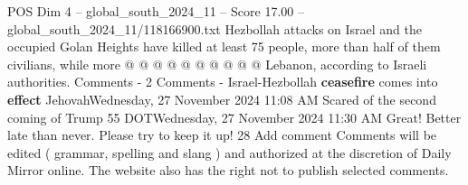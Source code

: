 \begin{textsample}{POS Dim 4 – global\_south\_2024\_11 – Score 17.00 – global\_south\_2024\_11/118166900.txt}
Hezbollah attacks on Israel and the occupied Golan Heights have killed at least 75 people, more than half of them civilians, while more @ @ @ @ @ @ @ @ @ @ Lebanon, according to Israeli authorities.
Comments - 2 Comments - Israel-Hezbollah \textbf{ceasefire} comes into \textbf{effect} JehovahWednesday, 27 November 2024 11:08 AM Scared of the second coming of Trump 55 DOTWednesday, 27 November 2024 11:30 AM Great!
Better late than never.
Please try to keep it up! 28 Add comment Comments will be edited ( grammar, spelling and slang ) and authorized at the discretion of Daily Mirror online.
The website also has the right not to publish selected comments.

\end{textsample}
